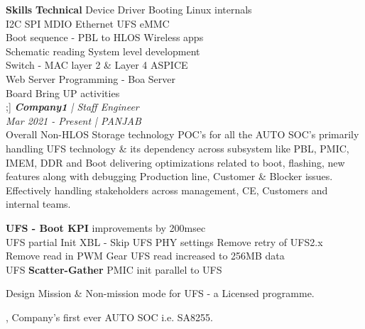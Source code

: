 \documentclass[a4paper]{chirri} %
\begin{document}
\begin{tcolorbox}
{{      \textbf{Skills}
      \textbf{Technical}{ }          %
         \textbullet Device Driver \textbullet Booting \textbullet Linux internals \\
         \textbullet I2C \textbullet SPI \textbullet MDIO \textbullet Ethernet \textbullet UFS \textbullet eMMC \\ 
         \textbullet Boot sequence - PBL to HLOS \textbullet Wireless apps\\
         \textbullet Schematic reading \textbullet System level development \\
         \textbullet Switch - MAC layer 2 \& Layer 4 \textbullet ASPICE \\
         \textbullet Web Server Programming - Boa Server \\
         \textbullet Board Bring UP activities \\
  };}]
{\large{\textit{\textbf{Company1} | Staff Engineer}}}\\
{\small{\textit{Mar 2021 - Present | PANJAB}}} \\
\scriptsize{Overall Non-HLOS Storage technology POC's for all the AUTO SOC's primarily handling UFS technology \& its dependency across subsystem like PBL, PMIC, IMEM, DDR and Boot \textendash{} delivering optimizations related to boot, flashing, new features along with debugging Production line, Customer \& Blocker issues. \\
Effectively handling stakeholders across management, CE, Customers and internal teams.%
}
\begin{itemize}
\footnotesize {
   \item \noindent \textbf{UFS - Boot KPI} improvements \textemdash{} by 200msec \\
      \textbullet UFS partial Init               \textbullet XBL - Skip UFS PHY settings    \textbullet Remove retry of UFS2.x \\
      \textbullet Remove read in PWM Gear        \textbullet UFS read increased to 256MB data   \\
      \textbullet UFS \textbf{Scatter-Gather}    \textbullet PMIC init parallel to UFS
      \item \noindent Design Mission \& Non-mission mode for UFS - a Licensed programme.
      \item {}, Company's first ever AUTO SOC i.e. SA8255.
%
      \begin{itemize}

\end{itemize}}
\end{itemize}
\end{tcolorbox}
\end{document}
